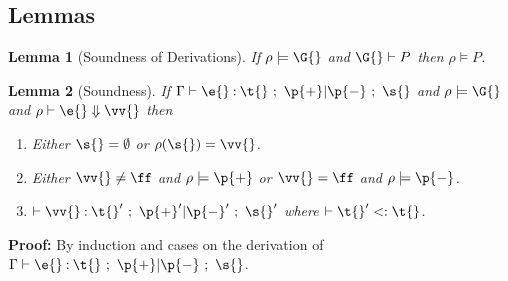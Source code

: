 \documentclass{article}[12pt]
\newtheorem{lemma}{Lemma}
\begin{document}
\subsection{Lemmas}

\begin{lemma}[Soundness of Derivations]
If $\rho \models \G{}$ and $\G{} \vdash P$ then $\rho \models P$.
\label{lem:mod-concl}
\end{lemma}

\begin{lemma}[Soundness]
If $\hastyeff{\e{}}{\t{}}{\p{+}}{\p{-}}{\s{}}$ and $\rho \models
\G{}$ and $\evalprime{\e{}}{\vv{}}$ then

\begin{enumerate}
\item Either $\s{} = \noeffect$ or $\rho(\s{}) = \vv{}$.
\item Either $\vv{} \neq \ff$ and $\rho \models
\p{+}$ or $\vv{} = \ff$ and $\rho \models
\p{-}$.
\item $\hastyeff[]{\vv{}}{\t{}'}{\p{+}'}{\p{-}'}{\s{}'}$ where
$\subtype{\t{}'}{\t{}}$. 
\end{enumerate}
\end{lemma}

\noindent
{\bf Proof:}
By induction and cases on the derivation of
$\hastyeff{\e{}}{\t{}}{\p{+}}{\p{-}}{\s{}}$.
\end{document}
